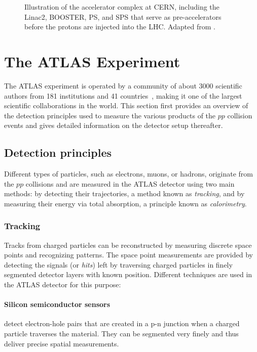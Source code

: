 \begin{figure}[t]
    \caption[Illustration of the accelerator complex at CERN.]{Illustration of the accelerator complex at CERN, including the Linac2, BOOSTER, PS, and SPS that serve as pre-accelerators before the protons are injected into the LHC. Adapted from .}
    \label{fig:accelerator-complex}
\end{figure}



\section{The ATLAS Experiment}
The ATLAS experiment is operated by a community of about 3000 scientific authors from 181 institutions and 41 countries~\cite{AtlasCollab}, making it one of the largest scientific collaborations in the world.
This section first provides an overview of the detection principles used to measure the various products of the $pp$ collision events and gives detailed information on the detector setup thereafter.

\subsection{Detection principles}
\label{subsec:measurement-principles}
Different types of particles, such as electrons, muons, or hadrons, originate from the $pp$ collisions and are measured in the ATLAS detector using two main methods: by detecting their trajectories, a method known as \emph{tracking}, and by measuring their energy via total absorption, a principle known as \emph{calorimetry}.

\subsubsection{Tracking}
Tracks from charged particles can be reconstructed by measuring discrete space points and recognizing patterns.
The space point measurements are provided by detecting the signals (or \emph{hits}) left by traversing charged particles in finely segmented detector layers with known position. Different techniques are used in the ATLAS detector for this purpose:
\paragraph{Silicon semiconductor sensors} detect electron-hole pairs that are created in a p-n junction when a charged particle traverses the material. They can be segmented very finely and thus deliver precise spatial measurements.
